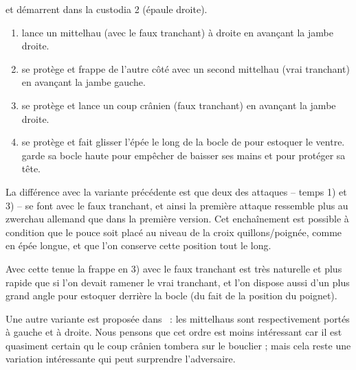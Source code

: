 \begin{technique}
\label{épée-bocle:tech:liegniczer:4v}

\A et \D démarrent dans la custodia 2 (épaule droite).

\begin{enumerate}
	\item \A lance un mittelhau (avec le faux tranchant) à droite en avançant la jambe droite.
	
	\item \D se protège et \A frappe de l'autre côté avec un second mittelhau (vrai tranchant) en avançant la jambe gauche.
	
	\item \D se protège et \A lance un coup crânien (faux tranchant) en avançant la jambe droite.
	
	\item \D se protège et \A fait glisser l'épée le long de la bocle de \D pour estoquer le ventre.
		\A garde sa bocle haute pour empêcher \D de baisser ses mains et pour protéger sa tête.
\end{enumerate}

La différence avec la variante précédente est que deux des attaques – temps 1) et 3) – se font avec le faux tranchant, et ainsi la première attaque ressemble plus au zwerchau allemand que dans la première version.
Cet enchaînement est possible à condition que le pouce soit placé au niveau de la croix quillons/poignée, comme en épée longue, et que l'on conserve cette position tout le long.

Avec cette tenue la frappe en 3) avec le faux tranchant est très naturelle et plus rapide que si l'on devait ramener le vrai tranchant, et l'on dispose aussi d'un plus grand angle pour estoquer derrière la bocle (du fait de la position du poignet).

\end{technique}


Une autre variante est proposée dans~\cite{youtube:sala_armi:liegniczer} : les mittelhaus sont respectivement portés à gauche et à droite.
Nous pensons que cet ordre est moins intéressant car il est quasiment certain qu le coup crânien tombera sur le bouclier ; mais cela reste une variation intéressante qui peut surprendre l'adversaire.


